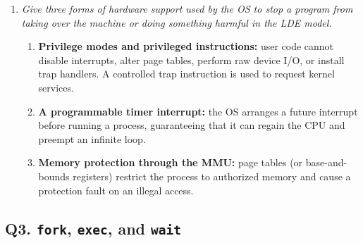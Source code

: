 \begin{enumerate}
\item[(c)] \emph{Give three forms of hardware support used by the OS to stop
a program from taking over the machine or doing something harmful in the
LDE model.}

\begin{enumerate}
\item \textbf{Privilege modes and privileged instructions:} user code cannot
disable interrupts, alter page tables, perform raw device I/O, or install
trap handlers.  A controlled trap instruction is used to request kernel
services.
\item \textbf{A programmable timer interrupt:} the OS arranges a future
interrupt before running a process, guaranteeing that it can regain the CPU
and preempt an infinite loop.
\item \textbf{Memory protection through the MMU:} page tables (or
base-and-bounds registers) restrict the process to authorized memory and
cause a protection fault on an illegal access.
\end{enumerate}
\end{enumerate}

\subsection*{Q3. \texttt{fork}, \texttt{exec}, and \texttt{wait}}

